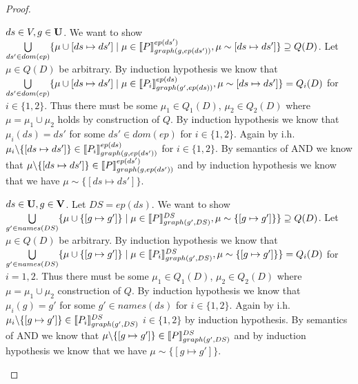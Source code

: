 \begin{proof}
\begin{enumerate}
			\bigskip\noindent
			$ds \in V, g \in \mathbf{U}$.
			We want to show 
			$\bigcup\limits_{ds' \in dom(ep)} \{ \mu \cup
				[ds \mapsto ds'] \mid \mu \in \llbracket P\rrbracket^{ep(ds')}_{graph(g,ep(ds'))}, \mu \sim
			[ds\mapsto ds'] \}  \supseteq Q(D)$.
			Let $\mu \in Q(D)$ be arbitrary.
			By induction hypothesis we know that  
			$\bigcup\limits_{ds' \in dom(ep)} \{ \mu \cup [ds \mapsto ds'] \mid \mu \in
				\llbracket P_i\rrbracket^{ep(ds)}_{graph(g',ep(ds))}, \mu \sim
			[ds\mapsto ds'] \}  = Q_i(D) $ for $i\in \{1,2\}$.
			Thus there must be some $\mu_1 \in Q_1(D)$, $\mu_2 \in Q_2(D)$ 
			where $\mu= \mu_1 \cup \mu_2$ holds by construction of $Q$.
			By induction hypothesis we know that $\mu_i(ds) = ds'$ for some $ds'
			\in dom(ep)$ for $i \in \{1,2\}$.
			Again by i.h. $\mu_i\backslash\{[ds\mapsto ds'] \} \in \llbracket P_i
			\rrbracket^{ep(ds)}_{graph(g,ep(ds'))}$ for $i \in \{1,2\}$.
			By semantics of AND we know that $\mu \backslash \{[ds\mapsto ds'] \} \in \llbracket P
			\rrbracket^{ep(ds')}_{graph(g,ep(ds'))}$ and by induction hypothesis we know that we have 
			$\mu \sim \{[ds\mapsto ds'] \}$.

			\bigskip\noindent
			$ds \in \mathbf{U}, g \in \mathbf{V}$. Let $DS = ep(ds)$.
			We want to show 
			$\bigcup\limits_{g' \in names(DS)} \{ \mu \cup \{[g
				\mapsto g']\} \mid \mu \in
				\llbracket P\rrbracket^{DS}_{graph(g',DS)}, \mu \sim
			\{[g \mapsto g']\} \}  \supseteq Q(D) $.
			Let $\mu \in Q(D)$ be arbitrary.
			By induction hypothesis we know that  
			$\bigcup\limits_{g' \in names(DS)} \{ \mu \cup \{[g
				\mapsto g']\} \mid \mu \in
				\llbracket P_i\rrbracket^{DS}_{graph(g',DS)}, \mu \sim
			\{[g \mapsto g']\} \}  = Q_i(D) $ for $i=1,2$.
			Thus there must be some $\mu_1 \in Q_1(D)$, $\mu_2 \in Q_2(D)$ 
			where $\mu= \mu_1 \cup \mu_2$ construction of $Q$.
			By induction hypothesis we know that $\mu_i(g) = g'$ for some $g'
			\in names(ds)$ for $i \in \{1,2\}$.
			Again by i.h. $\mu_i\backslash\{ [g \mapsto g'] \} \in \llbracket P_i \rrbracket^{DS}_{graph(g',DS)}$
			$i \in \{1,2\}$ by induction hypothesis. 
			By semantics of AND  we know that $\mu \backslash \{[g \mapsto g'] \} \in \llbracket P
			\rrbracket^{DS}_{graph(g',DS)}$ and by induction hypothesis we know that we have 
			$\mu \sim \{[g \mapsto g'] \}$.


\end{enumerate}
\end{proof}
